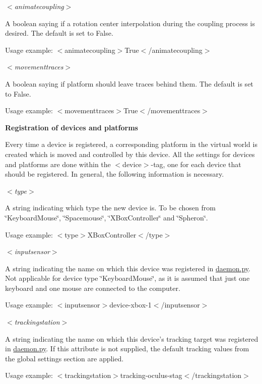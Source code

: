 {\itshape $<$animatecoupling$>$\/}\par
 \-A boolean saying if a rotation center interpolation during the coupling process is desired. \-The default is set to \-False.\par
 \-Usage example\-: {\ttfamily $<$animatecoupling$>$\-True$<$/animatecoupling$>$}

{\itshape $<$movementtraces$>$\/}\par
 \-A boolean saying if platform should leave traces behind them. \-The default is set to \-False.\par
 \-Usage example\-: {\ttfamily $<$movementtraces$>$\-True$<$/movementtraces$>$}

\par


{\bfseries \-Registration of devices and platforms}\par
 \-Every time a device is registered, a corresponding platform in the virtual world is created which is moved and controlled by this device. \-All the settings for devices and platforms are done within the $<$device$>$-\/tag, one for each device that should be registered. \-In general, the following information is necessary.

{\itshape $<$type$>$\/}\par
 \-A string indicating which type the new device is. \-To be chosen from \char`\"{}\-Keyboard\-Mouse\char`\"{}, \char`\"{}\-Spacemouse\char`\"{}, \char`\"{}\-X\-Box\-Controller\char`\"{} and \char`\"{}\-Spheron\char`\"{}.\par
 \-Usage example\-: {\ttfamily $<$type$>$\-X\-Box\-Controller$<$/type$>$}

{\itshape $<$inputsensor$>$\/}\par
 \-A string indicating the name on which this device was registered in \hyperlink{daemon_8py}{daemon.\-py}. \-Not applicable for device type \char`\"{}\-Keyboard\-Mouse\char`\"{}, as it is assumed that just one keyboard and one mouse are connected to the computer.\par
 \-Usage example\-: {\ttfamily $<$inputsensor$>$device-\/xbox-\/1$<$/inputsensor$>$}

{\itshape $<$trackingstation$>$\/}\par
 \-A string indicating the name on which this device's tracking target was registered in \hyperlink{daemon_8py}{daemon.\-py}. \-If this attribute is not supplied, the default tracking values from the global settings section are applied.\par
 \-Usage example\-: {\ttfamily $<$trackingstation$>$tracking-\/oculus-\/stag$<$/trackingstation$>$}

